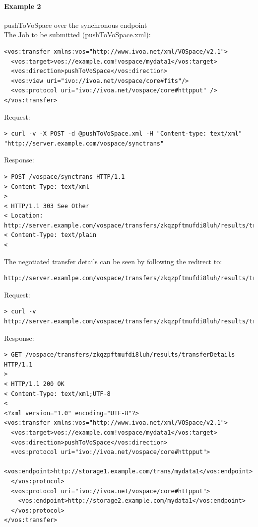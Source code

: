 \documentclass[11pt,a4paper]{ivoa}
\begin{document}
\paragraph{Example 2}
pushToVoSpace over the synchronous endpoint
\\[5px]
\noindent
The Job to be submitted (pushToVoSpace.xml):
\begin{lstlisting}
<vos:transfer xmlns:vos="http://www.ivoa.net/xml/VOSpace/v2.1">
  <vos:target>vos://example.com!vospace/mydata1</vos:target>
  <vos:direction>pushToVoSpace</vos:direction>
  <vos:view uri="ivo://ivoa.net/vospace/core#fits"/>
  <vos:protocol uri="ivo://ivoa.net/vospace/core#httpput" />
</vos:transfer>
\end{lstlisting}
Request:
\begin{lstlisting}
> curl -v -X POST -d @pushToVoSpace.xml -H "Content-type: text/xml" "http://server.example.com/vospace/synctrans"
\end{lstlisting}
Response:
\begin{lstlisting}
> POST /vospace/synctrans HTTP/1.1
> Content-Type: text/xml
>
< HTTP/1.1 303 See Other
< Location: http://server.example.com/vospace/transfers/zkqzpftmufdi8luh/results/transferDetails
< Content-Type: text/plain
<
\end{lstlisting}
The negotiated transfer details can be seen by following the redirect to:
\begin{lstlisting}
http://server.examlpe.com/vospace/transfers/zkqzpftmufdi8luh/results/transferDetails
\end{lstlisting}
Request:
\begin{lstlisting}
> curl -v http://server.example.com/vospace/transfers/zkqzpftmufdi8luh/results/transferDetails
\end{lstlisting}
Response:
\begin{lstlisting}
> GET /vospace/transfers/zkqzpftmufdi8luh/results/transferDetails HTTP/1.1
>
< HTTP/1.1 200 OK
< Content-Type: text/xml;UTF-8
<
<?xml version="1.0" encoding="UTF-8"?>
<vos:transfer xmlns:vos="http://www.ivoa.net/xml/VOSpace/v2.1">
  <vos:target>vos://example.com!vospace/mydata1</vos:target>
  <vos:direction>pushToVoSpace</vos:direction>
  <vos:protocol uri="ivo://ivoa.net/vospace/core#httpput">
    <vos:endpoint>http://storage1.example.com/trans/mydata1</vos:endpoint>
  </vos:protocol>
  <vos:protocol uri="ivo://ivoa.net/vospace/core#httpput">
    <vos:endpoint>http://storage2.example.com/mydata1</vos:endpoint>
  </vos:protocol>
</vos:transfer>
\end{lstlisting}
\end{document}
